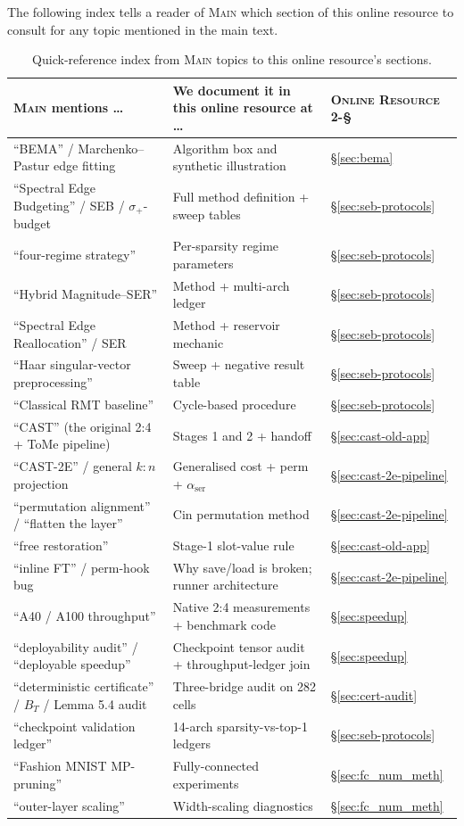 \documentclass[11pt]{article}
\theoremstyle{plain}
\theoremstyle{definition}
\theoremstyle{remark}
\newcommand{\1}{\mathbf{1}}
\newcommand{\mainpaper}{\textsc{Main}}
\newcommand{\methpaper}{\textsc{Online Resource 2}}
\begin{document}
\noindent The following index tells a reader of \mainpaper{} which section of this online resource to consult for any topic mentioned in the main text.

\begin{table}[h]
\centering
\caption{Quick-reference index from \mainpaper{} topics to this online resource's sections.}
\label{tab:quick-index}
\small
\begin{tabularx}{\textwidth}{lXl}
\toprule
\mainpaper{} mentions \ldots & We document it in this online resource at \ldots & \methpaper{}-\S \\
\midrule
``BEMA'' / Marchenko--Pastur edge fitting & Algorithm box and synthetic illustration & \S\ref{sec:bema} \\
``Spectral Edge Budgeting'' / SEB / $\sigma_+$-budget & Full method definition + sweep tables & \S\ref{sec:seb-protocols} \\
``four-regime strategy'' & Per-sparsity regime parameters & \S\ref{sec:seb-protocols} \\
``Hybrid Magnitude--SER'' & Method + multi-arch ledger & \S\ref{sec:seb-protocols} \\
``Spectral Edge Reallocation'' / SER & Method + reservoir mechanic & \S\ref{sec:seb-protocols} \\
``Haar singular-vector preprocessing'' & Sweep + negative result table & \S\ref{sec:seb-protocols} \\
``Classical RMT baseline'' & Cycle-based procedure & \S\ref{sec:seb-protocols} \\
``CAST'' (the original 2:4 + ToMe pipeline) & Stages 1 and 2 + handoff & \S\ref{sec:cast-old-app} \\
``CAST-2E'' / general $k{:}n$ projection & Generalised cost + perm + $\alpha_{\mathrm{ser}}$ & \S\ref{sec:cast-2e-pipeline} \\
``permutation alignment'' / ``flatten the layer'' & Cin permutation method & \S\ref{sec:cast-2e-pipeline} \\
``free restoration'' & Stage-1 slot-value rule & \S\ref{sec:cast-old-app} \\
``inline FT'' / perm-hook bug & Why save/load is broken; runner architecture & \S\ref{sec:cast-2e-pipeline} \\
``A40 / A100 throughput'' & Native 2:4 measurements + benchmark code & \S\ref{sec:speedup} \\
``deployability audit'' / ``deployable speedup'' & Checkpoint tensor audit + throughput-ledger join & \S\ref{sec:speedup} \\
``deterministic certificate'' / $B_T$ / Lemma 5.4 audit & Three-bridge audit on 282 cells & \S\ref{sec:cert-audit} \\
``checkpoint validation ledger'' & 14-arch sparsity-vs-top-1 ledgers & \S\ref{sec:seb-protocols} \\
``Fashion MNIST MP-pruning'' & Fully-connected experiments & \S\ref{sec:fc_num_meth} \\
``outer-layer scaling'' & Width-scaling diagnostics & \S\ref{sec:fc_num_meth} \\
\bottomrule
\end{tabularx}
\end{table}
\end{document}
